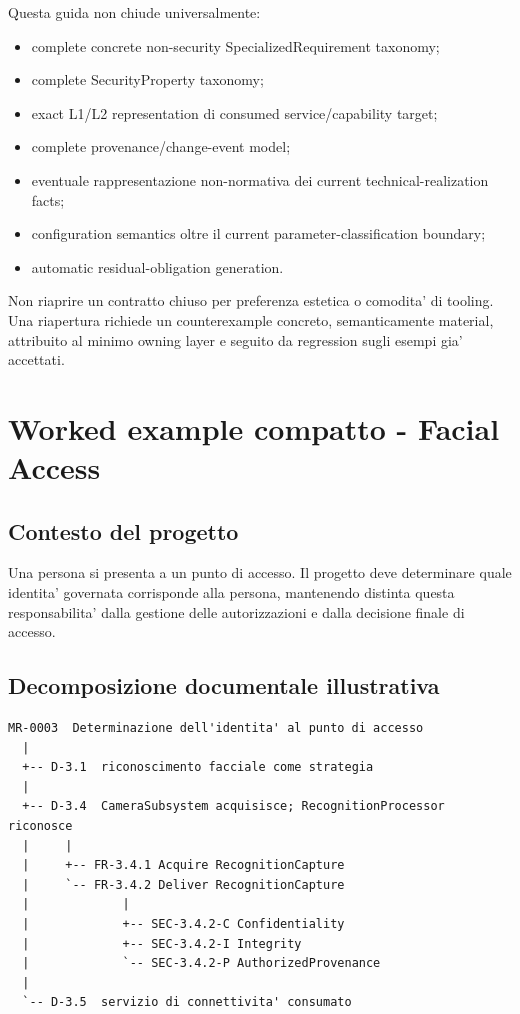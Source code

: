 \documentclass[11pt,a4paper]{article}
\begin{document}
Questa guida non chiude universalmente:
\begin{itemize}
  \item complete concrete non-security SpecializedRequirement taxonomy;
  \item complete SecurityProperty taxonomy;
  \item exact L1/L2 representation di consumed service/capability target;
  \item complete provenance/change-event model;
  \item eventuale rappresentazione non-normativa dei current technical-realization facts;
  \item configuration semantics oltre il current parameter-classification boundary;
  \item automatic residual-obligation generation.
\end{itemize}

\begin{ddtacore}[title={Reopen rule}]
Non riaprire un contratto chiuso per preferenza estetica o comodita' di tooling. Una riapertura richiede un counterexample concreto, semanticamente material, attribuito al minimo owning layer e seguito da regression sugli esempi gia' accettati.
\end{ddtacore}

\appendix
\section{Worked example compatto - Facial Access}

\subsection{Contesto del progetto}

Una persona si presenta a un punto di accesso. Il progetto deve determinare quale identita' governata corrisponde alla persona, mantenendo distinta questa responsabilita' dalla gestione delle autorizzazioni e dalla decisione finale di accesso.

\subsection{Decomposizione documentale illustrativa}

\begin{lstlisting}
MR-0003  Determinazione dell'identita' al punto di accesso
  |
  +-- D-3.1  riconoscimento facciale come strategia
  |
  +-- D-3.4  CameraSubsystem acquisisce; RecognitionProcessor riconosce
  |     |
  |     +-- FR-3.4.1 Acquire RecognitionCapture
  |     `-- FR-3.4.2 Deliver RecognitionCapture
  |             |
  |             +-- SEC-3.4.2-C Confidentiality
  |             +-- SEC-3.4.2-I Integrity
  |             `-- SEC-3.4.2-P AuthorizedProvenance
  |
  `-- D-3.5  servizio di connettivita' consumato
\end{lstlisting}
\end{document}
